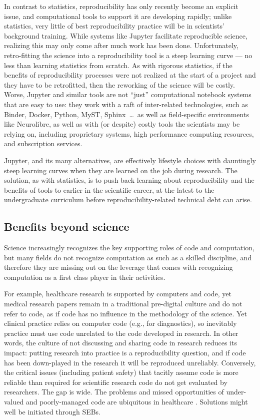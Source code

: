 \documentclass{comjnl}
\begin{document}
In contrast to statistics, reproducibility has only recently become an explicit issue, and computational tools to support it are developing rapidly; unlike statistics, very little of best reproducibility practice will be in scientists' background training. While systems like Jupyter facilitate reproducible science, realizing this may only come after much work has been done. Unfortunately, retro-fitting the science into a reproducibility tool is a steep learning curve --- no less than learning statistics from scratch. As with rigorous statistics, if the benefits of reproducibility processes were not realized at the start of a project and they have to be retrofitted, then the reworking of the science will be costly. Worse, Jupyter and similar tools are not ``just'' computational notebook systems that are easy to use: they work with a raft of inter-related technologies, such as Binder, Docker, Python, MyST, Sphinx\ \ldots\ as well as field-specific environments like Neurolibre, as well as with (or despite) costly tools the scientists may be relying on, including proprietary systems, high performance computing resources, and subscription services.

Jupyter, and its many alternatives, are effectively lifestyle choices with dauntingly steep learning curves when they are learned on the job during research. The solution, as with statistics, is to push back learning about reproducibility and the benefits of tools to earlier in the scientific career, at the latest to the undergraduate curriculum before reproducibility-related technical debt can arise.

\subsection{Benefits beyond science}\label{benefits-beyond-science}
Science increasingly recognizes the key supporting roles of code and computation, but many fields do not recognize computation as such as a skilled discipline, and therefore they are missing out on the leverage that comes with recognizing computation as a first class player in their activities. 

For example, healthcare research is supported by computers and code, yet medical research papers remain in a traditional pre-digital culture and do not refer to code, as if code has no influence in the methodology of the science. Yet clinical practice relies on computer code (e.g., for diagnostics), so inevitably practice must use code unrelated to the code developed in research. In other words, the culture of not discussing and sharing code in research reduces its impact: putting research into practice is a reproducibility question, and if code has been down-played in the research it will be reproduced unreliably. Conversely, the critical issues (including patient safety) that tacitly assume code is more reliable than required for scientific research code do not get evaluated by researchers. The gap is wide. The problems and missed opportunities of under-valued and poorly-managed code are ubiquitous in healthcare \cite{fixit}. Solutions might well be initiated through SEBs.
\end{document}
